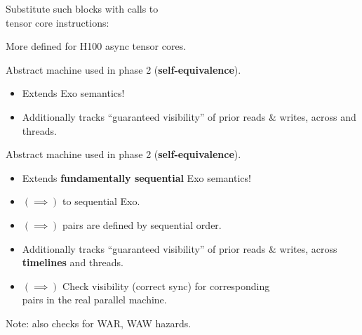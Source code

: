 \newpage
{}

{\LARGE
Substitute such blocks with calls to\\
 tensor core instructions:

}

{\LARGE

}

{\LARGE
More  defined for H100 async tensor cores.

}


\newpage
{}

{\LARGE
Abstract machine used in phase 2 (\textbf{self-equivalence}).
\begin{itemize}
  \item Extends  Exo semantics!
  \item Additionally tracks ``guaranteed visibility'' of prior reads \& writes, across  and threads.
\end{itemize}

}

\begin{center}
{\large
{}
}
\end{center}


\newpage
{}

{\LARGE
Abstract machine used in phase 2 (\textbf{self-equivalence}).
\begin{itemize}
  \item {\color{lightgray} Extends \textbf{fundamentally sequential} Exo semantics!}
  \item $(\implies)$  to sequential Exo.
  \item $(\implies)$  pairs are defined by sequential order.
  \item {\color{lightgray} Additionally tracks ``guaranteed visibility'' of prior reads \& writes, across \textbf{timelines} and threads.}
  \item $(\implies)$ Check visibility (correct sync) for corresponding\\ pairs in the real parallel machine.
\end{itemize}

\vfill

\hfill Note: also checks for WAR, WAW hazards.

}


